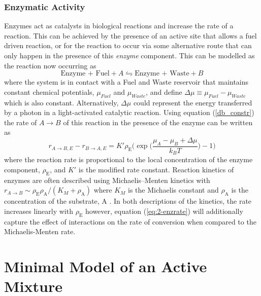 \subsubsection{Enzymatic Activity}
Enzymes act as catalysts in biological reactions and increase the rate of a reaction. This can be achieved by the presence of an active site that allows a fuel driven reaction, or for the reaction to occur via some alternative route that can only happen in the presence of this \textit{enzyme} component. This can be modelled as the reaction now occurring as
\begin{equation}
    \text{Enzyme + Fuel} + A \leftrightharpoons \text{Enzyme + Waste} + B
\end{equation}
where the system is in contact with a Fuel and Waste reservoir that maintains constant chemical potentials, $\mu_{Fuel}$ and $\mu_{Waste}$, and define $\Delta\mu \equiv \mu_{Fuel}-\mu_{Waste}$ which is also constant. Alternatively, $\Delta \mu$ could represent the energy transferred by a photon in a light-activated catalytic reaction. Using equation (\ref{db_constr}) the rate of $A \rightarrow B$ of this reaction in the presence of the enzyme can be written as
\begin{equation}
    r_{A \rightarrow B,E} - r_{B \rightarrow A,E} = K'\rho_\textrm{E}\Bigg(\exp\bigg(\frac{\mu_A - \mu_B + \Delta\mu}{k_B T}\bigg)-1\Bigg)
    \label{eq:2-enzrate}
\end{equation}
where the reaction rate is proportional to the local concentration of the enzyme component, $\rho_\textrm{E}$, and $K'$ is the modified rate constant. Reaction kinetics of enzymes are often described using Michaelis–Menten kinetics with $r_{A\rightarrow B}\sim\rho_\textrm{E}\rho_\textrm{A}/(K_{M}+\rho_\textrm{A})$ where $K_M$ is the Michaelis constant and $\rho_\textrm{A}$ is the concentration of the substrate, A \cite{murray_mathematical_1993}. In both  descriptions of the kinetics, the rate increases linearly with $\rho_\textrm{E}$ however, equation (\ref{eq:2-enzrate}) will additionally capture the effect of interactions on the rate of conversion when compared to the Michaelis-Menten rate.

\section{Minimal Model of an Active Mixture}

